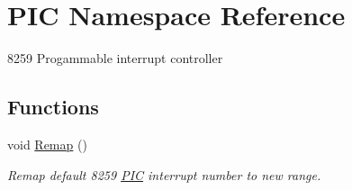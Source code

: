\hypertarget{namespace_p_i_c}{}\section{P\+IC Namespace Reference}
\label{namespace_p_i_c}


8259 Progammable interrupt controller  


\subsection*{Functions}
\begin{DoxyCompactItemize}
\item 
void \hyperlink{namespace_p_i_c_a2a04fe95329faacc43f00ad30fe554b9}{Remap} ()
\begin{DoxyCompactList}\small\item\em Remap default 8259 \hyperlink{namespace_p_i_c}{P\+IC} interrupt number to new range. \end{DoxyCompactList}\end{DoxyCompactItemize}
